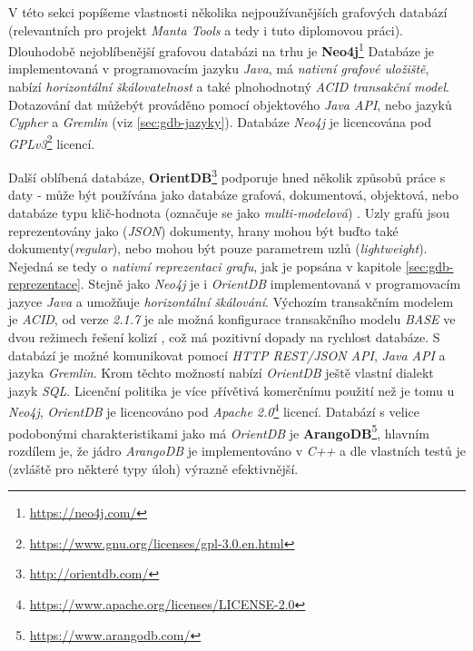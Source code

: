 V této sekci popíšeme vlastnosti několika nejpoužívanějších grafových databází (relevantních pro projekt \textit{Manta Tools} a tedy i tuto diplomovou práci). Dlouhodobě nejoblíbenější grafovou databázi na trhu \cite{Ranking17} je \textbf{Neo4j}\footnote{\url{https://neo4j.com/}} Databáze je implementovaná v programovacím jazyku \textit{Java}, má \textit{nativní grafové uložiště}, nabízí \textit{horizontální škálovatelnost} a také plnohodnotný \textit{ACID transakční model}. Dotazování dat můžebýt prováděno pomocí objektového \textit{Java API}, nebo jazyků \textit{Cypher} a \textit{Gremlin} (viz \ref{sec:gdb-jazyky}). Databáze \textit{Neo4j} je licencována pod \textit{GPLv3}\footnote{\url{https://www.gnu.org/licenses/gpl-3.0.en.html}} licencí.

Další oblíbená databáze, \textbf{OrientDB}\footnote{\url{http://orientdb.com/}} podporuje hned několik způsobů práce s daty - může být používána jako databáze grafová, dokumentová, objektová, nebo databáze typu klič-hodnota (označuje se jako \textit{multi-modelová}) \cite{OrientMultiModel}. Uzly grafů jsou reprezentovány jako (\textit{JSON}) dokumenty, hrany mohou být buďto také dokumenty(\textit{regular}), nebo mohou být pouze parametrem uzlů (\textit{lightweight}). Nejedná se tedy o \textit{nativní reprezentaci grafu}, jak je popsána v kapitole \ref{sec:gdb-reprezentace}. %
Stejně jako \textit{Neo4j} je i \textit{OrientDB} implementovaná v programovacím jazyce \textit{Java} a umožňuje \textit{horizontální škálování}. Výchozím transakčním modelem je \textit{ACID}, od verze \textit{2.1.7} je ale možná konfigurace transakčního modelu \textit{BASE} ve dvou režimech řešení kolizí \cite{OrientConsistency}, což má pozitivní dopady na rychlost databáze. S databází je možné komunikovat pomocí \textit{HTTP REST/JSON API}, \textit{Java API} a jazyka \textit{Gremlin}. Krom těchto možností nabízí \textit{OrientDB} ještě vlastní dialekt jazyk \textit{SQL}. Licenční politika je více přívětivá komerčnímu použití než je tomu u \textit{Neo4j}, \textit{OrientDB} je licencováno pod \textit{Apache 2.0}\footnote{\url{https://www.apache.org/licenses/LICENSE-2.0}} licencí. 
Databází s velice podobonými charakteristikami jako má \textit{OrientDB} je \textbf{ArangoDB}\footnote{\url{https://www.arangodb.com/}}, hlavním rozdílem je, že jádro \textit{ArangoDB} je implementováno v \textit{C++} a dle vlastních testů \cite{ArangoBenchmark} je (zvláště pro některé typy úloh) výrazně efektivnější. 
 
